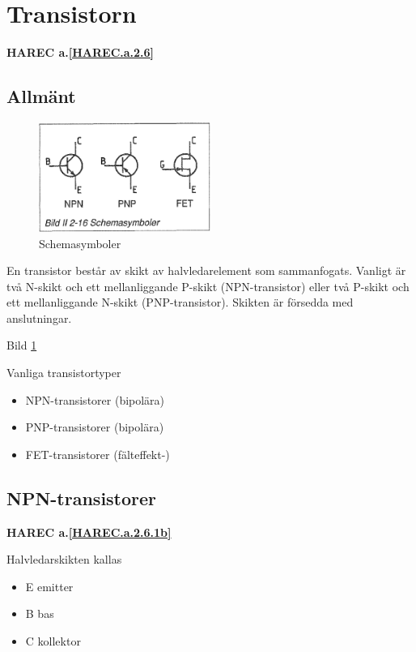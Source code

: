 \section{Transistorn}
\textbf{HAREC a.\ref{HAREC.a.2.6}\label{myHAREC.a.2.6}}
\label{transistorn}

\subsection{Allmänt}

\begin{figure}
\includegraphics[width=0.5\textwidth]{images/bild_2_2-16}
\caption{Schemasymboler}
\label{fig:BildII2-16}
\end{figure}

En transistor består av skikt av halvledarelement som sammanfogats. Vanligt är
två N-skikt och ett mellanliggande P-skikt (NPN-transistor) eller två P-skikt och
ett mellanliggande N-skikt (PNP-transistor). Skikten är försedda med
anslutningar.

Bild \ref{fig:BildII2-16}

Vanliga transistortyper
\begin{itemize}
\item NPN-transistorer (bipolära)
\item PNP-transistorer (bipolära)
\item FET-transistorer (fälteffekt-)
\end{itemize}

\subsection{NPN-transistorer}
\textbf{HAREC a.\ref{HAREC.a.2.6.1b}\label{myHAREC.a.2.6.1b}}

Halvledarskikten kallas
\begin{itemize}
\item E emitter
\item B bas
\item C kollektor
\end{itemize}

